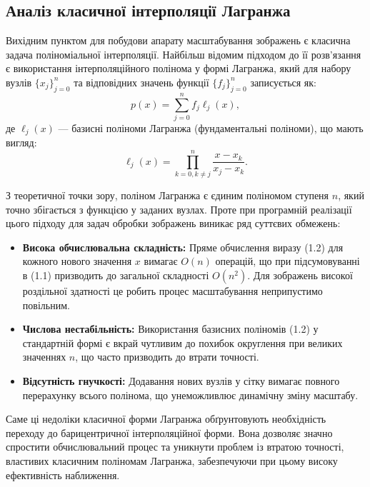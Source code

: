 \subsection{Аналіз класичної інтерполяції Лагранжа}

Вихідним пунктом для побудови апарату масштабування зображень є класична задача поліноміальної інтерполяції. Найбільш відомим підходом до її розв’язання є використання інтерполяційного полінома у формі Лагранжа, який для набору вузлів $\{x_j\}_{j=0}^n$ та відповідних значень функції $\{f_j\}_{j=0}^n$ записується як:
\begin{equation}\tag{1.1}
	p(x) = \sum_{j=0}^{n} f_j \ell_j(x),
\end{equation}
де $\ell_j(x)$ — базисні поліноми Лагранжа (фундаментальні поліноми), що мають вигляд:
\begin{equation}\tag{1.2}
	\ell_j(x) = \prod_{k=0, k \neq j}^{n} \frac{x - x_k}{x_j - x_k}.
\end{equation}

З теоретичної точки зору, поліном Лагранжа є єдиним поліномом ступеня $n$, який точно збігається з функцією у заданих вузлах. Проте при програмній реалізації цього підходу для задач обробки зображень виникає ряд суттєвих обмежень:

\begin{itemize}
	\item \textbf{Висока обчислювальна складність:} Пряме обчислення виразу (1.2) для кожного нового значення $x$ вимагає $O(n)$ операцій, що при підсумовуванні в (1.1) призводить до загальної складності $O(n^2)$. Для зображень високої роздільної здатності це робить процес масштабування неприпустимо повільним.
	\item \textbf{Числова нестабільність:} Використання базисних поліномів (1.2) у стандартній формі є вкрай чутливим до похибок округлення при великих значеннях $n$, що часто призводить до втрати точності.
	\item \textbf{Відсутність гнучкості:} Додавання нових вузлів у сітку вимагає повного перерахунку всього полінома, що унеможливлює динамічну зміну масштабу.
\end{itemize}

Саме ці недоліки класичної форми Лагранжа обґрунтовують необхідність переходу до барицентричної інтерполяційної форми. Вона дозволяє значно спростити обчислювальний процес та уникнути проблем із втратою точності, властивих класичним поліномам Лагранжа, забезпечуючи при цьому високу ефективність наближення.